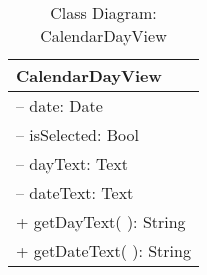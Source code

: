 \begin{table}[H]
\centering
\caption{Class Diagram: CalendarDayView}

\hspace{1em}
\renewcommand{\arraystretch}{1.7}

\begin{tabular}{|l|}
\hline
\textbf{CalendarDayView} \\
\hline
– date: Date \\
– isSelected: Bool \\
– dayText: Text \\
– dateText: Text \\
\hdashline
+ getDayText( ): String \\
+ getDateText( ): String \\
\hline
\end{tabular}
\end{table}
